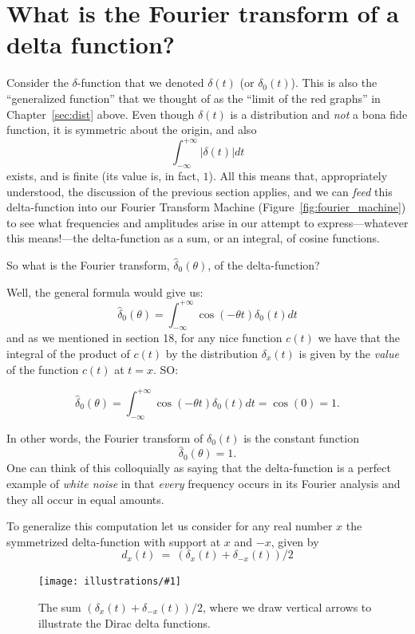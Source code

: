 \documentclass[openany]{book}
\newcommand{\ill}[3]{%
   \begin{figure}[H]%
   \vspace{-2ex}
   \centering%
   \texttt{[image: illustrations/\#1]}%
   \caption{#3}%
   \vspace{-2ex}
    \end{figure}}
\theoremstyle{plain}
\theoremstyle{definition}
\begin{document}
  

\chapter[Fourier transform of delta]{What is the Fourier transform of a delta function?\label{sec:ftdelta}}

Consider the $\delta$-function that we denoted $\delta(t)$ (or
$\delta_0(t)$). This is also the ``generalized function'' that we
thought of as the ``limit of the red graphs'' in Chapter~\ref{sec:dist}
above. Even though $\delta(t)$ is a distribution and {\it not} a bona
fide function, it is symmetric about the origin, and
also $$\int_{-{\infty}}^{+{\infty}}|\delta(t)|dt$$ exists, and is
finite (its value is, in fact, $1$). All this means that,
appropriately understood, the discussion of the previous section
applies, and we can {\it feed} this delta-function into our Fourier
Transform Machine (Figure~\ref{fig:fourier_machine}) to see what
frequencies and amplitudes arise in our attempt to express---whatever
this means!---the delta-function as a sum, or an integral, of cosine
functions.
   
   
     So what is the Fourier transform,  ${\hat \delta_0}(\theta)$, of the delta-function?
     
          
Well, the general formula would give us:
  $$ {\hat \delta_0}(\theta) = \int_{-\infty}^{+\infty}\cos(-\theta t)\delta_0(t)dt$$
  and as we mentioned in section 18, for any nice function $c(t)$ we
  have that the integral of the product of $c(t)$ by the distribution
  $\delta_x(t)$ is given by the {\it value} of the function $c(t)$ at
  $t=x$.  SO:
  
$$ {\hat \delta_0}(\theta) = \int_{-\infty}^{+\infty}\cos(-\theta t)\delta_0(t)dt = \cos(0) = 1.$$
    
    
In other words, the Fourier transform of $\delta_0(t)$ is the constant
function $$ {\hat \delta_0}(\theta)=1.$$ One can think of this
colloquially as saying that the delta-function is a perfect example of
{\it white noise} in that {\it every} frequency occurs in its Fourier
analysis and they all occur in equal amounts.
        
To generalize this computation let us consider for any real number $x$
the symmetrized delta-function with support at $x$ and $-x$, given
by $$d_x(t) \ = \ (\delta_x(t) + \delta_{-x}(t))/2$$
    
    
    \ill{two_delta}{0.4}{The sum $(\delta_x(t) + \delta_{-x}(t))/2$, where we draw vertical arrows to illustrate the Dirac delta functions.}
    
\end{document}
